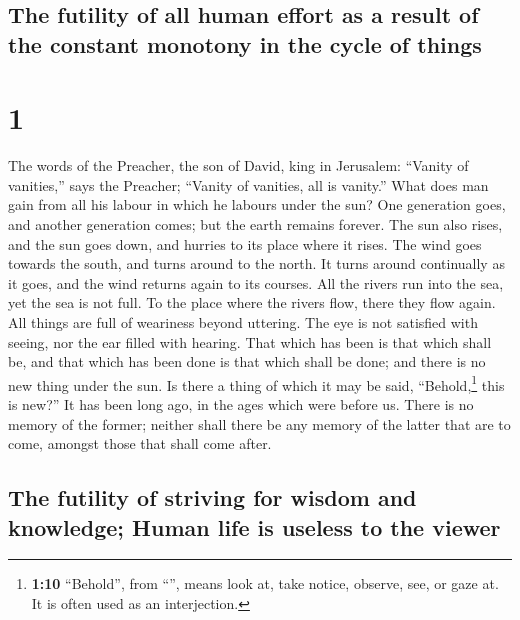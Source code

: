 \hypertarget{the-futility-of-all-human-effort-as-a-result-of-the-constant-monotony-in-the-cycle-of-things}{%
\subsection{The futility of all human effort as a result of the constant
monotony in the cycle of
things}\label{the-futility-of-all-human-effort-as-a-result-of-the-constant-monotony-in-the-cycle-of-things}}

\hypertarget{section}{%
\section{1}\label{section}}

 The words of the Preacher, the son of David, king in
Jerusalem:  ``Vanity of vanities,'' says the Preacher;
``Vanity of vanities, all is vanity.''  What does man gain
from all his labour in which he labours under the sun? 
One generation goes, and another generation comes; but the earth remains
forever.  The sun also rises, and the sun goes down, and
hurries to its place where it rises.  The wind goes
towards the south, and turns around to the north. It turns around
continually as it goes, and the wind returns again to its courses.
 All the rivers run into the sea, yet the sea is not full.
To the place where the rivers flow, there they flow again.
 All things are full of weariness beyond uttering. The eye
is not satisfied with seeing, nor the ear filled with hearing.
 That which has been is that which shall be, and that
which has been done is that which shall be done; and there is no new
thing under the sun.  Is there a thing of which it may be
said, ``Behold,\footnote{\textbf{1:10} ``Behold'', from
  ``'', means look at, take notice, observe, see, or gaze
  at. It is often used as an interjection.} this is new?'' It has been
long ago, in the ages which were before us.  There is no
memory of the former; neither shall there be any memory of the latter
that are to come, amongst those that shall come after.

\hypertarget{the-futility-of-striving-for-wisdom-and-knowledge-human-life-is-useless-to-the-viewer}{%
\subsection{The futility of striving for wisdom and knowledge; Human
life is useless to the
viewer}\label{the-futility-of-striving-for-wisdom-and-knowledge-human-life-is-useless-to-the-viewer}}

